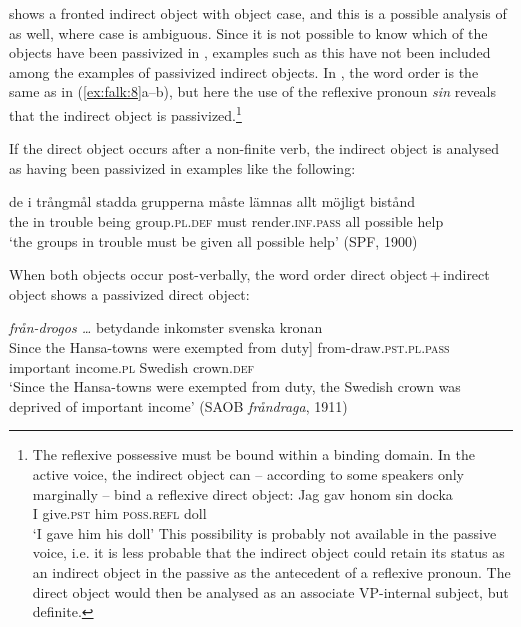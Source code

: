 \documentclass[output=paper]{langscibook}
\begin{document}
 shows a fronted indirect object with object case, and this is a possible analysis of  as well, where case is ambiguous. Since it is not possible to know which of the objects have been passivized in , examples such as this have not been included among the examples of passivized indirect objects. In , the word order is the same as in (\ref{ex:falk:8}a–b), but here the use of the reflexive pronoun \textit{sin} reveals that the indirect object is passivized.\footnote{The reflexive possessive must be bound within a binding domain. In the active voice, the indirect object can – according to some speakers only marginally – bind a reflexive direct object: 
\ea \gll Jag  gav    honom    sin    docka\\
     I      give.\textsc{pst}  him      \textsc{poss}.\textsc{refl}  doll\\
    \glt ‘I gave him his doll’
\z This possibility is probably not available in the passive voice, i.e. it is less probable that the indirect object could retain its status as an indirect object in the passive as the antecedent of a reflexive pronoun. The direct object would then be analysed as an associate VP-internal subject, but definite.}


If the direct object occurs after a non-finite verb, the indirect object is analysed as having been passivized in examples like the following:\largerpage

\ea%
    \label{ex:falk:9}
\gll de  i     trångmål  stadda  grupperna    måste  lämnas          allt  möjligt    bistånd\\
    the  in  trouble    being    group\textsc{.pl.def}   must  render\textsc{.inf}.\textsc{pass}  all    possible  help\\
\glt ‘the groups in trouble must be given all possible help’ (SPF, 1900)
\z


When both objects occur post-verbally, the word order direct object\,+\,indirect object shows a passivized direct object:

\ea%
    \label{ex:falk:10}
    \gll {{\ob}Genom Hansestädernas tullfrihet]} \textit{från-drogos …} betydande   inkomster  svenska    kronan \\
    {{\ob}Since the Hansa-towns were exempted from duty]}   from-draw\textsc{.pst.pl}.\textsc{pass}    important   income\textsc{.pl}  Swedish   crown.\textsc{def}\\
\glt ‘Since the Hansa-towns were exempted from duty, the Swedish crown was deprived of important income’ (SAOB \textit{fråndraga}, 1911)
\z
\end{document}
